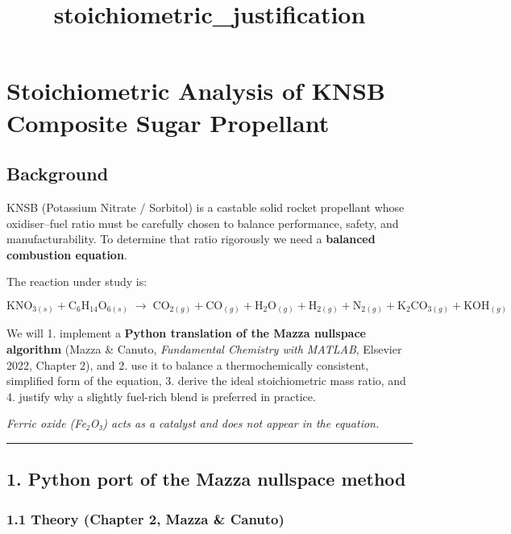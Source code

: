 \documentclass[11pt]{article}
\title{stoichiometric\_justification}
\begin{document}
    
    \maketitle
    
    

    
    \section{Stoichiometric Analysis of KNSB Composite Sugar
Propellant}\label{stoichiometric-analysis-of-knsb-composite-sugar-propellant}

\subsection{Background}\label{background}

KNSB (Potassium Nitrate / Sorbitol) is a castable solid rocket
propellant whose oxidiser--fuel ratio must be carefully chosen to
balance performance, safety, and manufacturability. To determine that
ratio rigorously we need a \textbf{balanced combustion equation}.

The reaction under study is:

\[
\text{KNO}_{3(s)} + \text{C}_6\text{H}_{14}\text{O}_{6(s)}
\;\rightarrow\;
\text{CO}_{2(g)} + \text{CO}_{(g)} + \text{H}_2\text{O}_{(g)} + \text{H}_{2(g)}
+ \text{N}_{2(g)} + \text{K}_2\text{CO}_{3(g)} + \text{KOH}_{(g)}
\]

We will 1. implement a \textbf{Python translation of the Mazza nullspace
algorithm} (Mazza \& Canuto, \emph{Fundamental Chemistry with MATLAB},
Elsevier 2022, Chapter 2), and 2. use it to balance a thermochemically
consistent, simplified form of the equation, 3. derive the ideal
stoichiometric mass ratio, and 4. justify why a slightly fuel-rich blend
is preferred in practice.

\emph{Ferric oxide (Fe₂O₃) acts as a catalyst and does not appear in the
equation.}

    \begin{center}\rule{0.5\linewidth}{0.5pt}\end{center}

\subsection{1. Python port of the Mazza nullspace
method}\label{python-port-of-the-mazza-nullspace-method}

\subsubsection{1.1 Theory (Chapter 2, Mazza \&
Canuto)}\label{theory-chapter-2-mazza-canuto}
\end{document}
